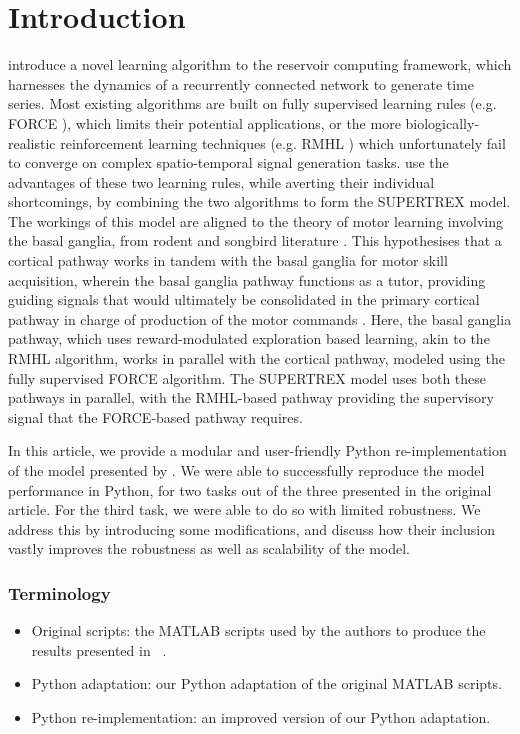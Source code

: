 


\section{Introduction}

\textcite{pyle2019} introduce a novel learning algorithm to the reservoir computing framework, which harnesses the dynamics of a recurrently connected network to generate time series. Most existing algorithms are built on fully supervised learning rules (e.g. FORCE \cite{sussillo2009}), which limits their potential applications, or the more biologically-realistic reinforcement learning techniques (e.g. RMHL \cite{hoerzer2014}) which unfortunately fail to converge on complex spatio-temporal signal generation tasks. \textcite{pyle2019} use the advantages of these two learning rules, while averting their individual shortcomings, by combining the two algorithms to form the SUPERTREX model. The workings of this model are aligned to the theory of motor learning involving the basal ganglia, from rodent and songbird literature \cite{brainard2002}. This hypothesises that a cortical pathway works in tandem with the basal ganglia for motor skill acquisition, wherein the basal ganglia pathway functions as a tutor, providing guiding signals that would ultimately be consolidated in the primary cortical pathway in charge of production of the motor commands \cite{olveczky2011}. Here, the basal ganglia pathway, which uses reward-modulated exploration based learning, akin to the RMHL algorithm, works in parallel with the cortical pathway, modeled using the fully supervised FORCE algorithm. The SUPERTREX model uses both these pathways in parallel, with the RMHL-based pathway providing the supervisory signal that the FORCE-based pathway requires.

In this article, we provide a modular and user-friendly Python re-implementation of the model presented by \textcite{pyle2019}. We were able to successfully reproduce the model performance in Python, for two tasks out of the three presented in the original article. For the third task, we were able to do so with limited robustness. We address this by introducing some modifications, and discuss how their inclusion vastly improves the robustness as well as scalability of the model.

\subsubsection{Terminology}
\begin{itemize}
    \item Original scripts: the MATLAB scripts used by the authors to produce the results presented in ~\cite{pyle2019}.
    \item Python adaptation: our Python adaptation of the original MATLAB scripts.
    \item Python re-implementation: an improved version of our Python adaptation. %
\end{itemize}

